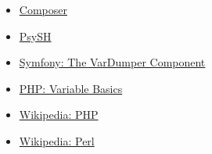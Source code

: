 \begin{itemize}[leftmargin=*]
    \item \href{https://getcomposer.org/}{Composer}
    \item \href{https://psysh.org/}{PsySH}
    \item \href{https://symfony.com/doc/current/components/var_dumper.html}{Symfony: The VarDumper Component}
    \item \href{http://php.net/manual/en/language.variables.basics.php}{PHP: Variable Basics}
    \item \href{https://en.wikipedia.org/wiki/PHP}{Wikipedia: PHP}
    \item \href{https://en.wikipedia.org/wiki/Perl}{Wikipedia: Perl}
\end{itemize}
